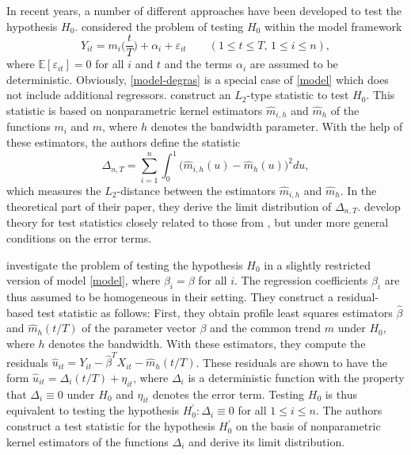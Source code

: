 \documentclass[a4paper,12pt]{article}
\begin{document}
In recent years, a number of different approaches have been developed to test the hypothesis $H_0$. \cite{DegrasWu2012} considered the problem of testing $H_0$ within the model framework
\begin{equation}\label{model-degras}
Y_{it} = m_i \Big( \frac{t}{T} \Big) + \alpha_i + \varepsilon_{it} \qquad (1 \le t \le T, \, 1 \le i \le n), 
\end{equation}
where $\mathbb{E}[\varepsilon_{it}] = 0$ for all $i$ and $t$ and the terms $\alpha_i$ are assumed to be deterministic. Obviously, \eqref{model-degras} is a special case of \eqref{model} which does not include additional regressors. \cite{DegrasWu2012} construct an $L_2$-type statistic to test $H_0$. This statistic is based on nonparametric kernel estimators $\hat{m}_{i,h}$ and $\hat{m}_h$ of the functions $m_i$ and $m$, where $h$ denotes the bandwidth parameter. With the help of these estimators, the authors define the statistic
\[ \Delta_{n,T} = \sum_{i=1}^n \int_0^1 \big(\hat{m}_{i,h}(u) - \hat{m}_h(u)\big)^2 du, \] 
which measures the $L_2$-distance between the estimators $\hat{m}_{i, h}$ and $\hat{m}_h$. In the theoretical part of their paper, they derive the limit distribution of $\Delta_{n,T}$. 
\cite{ChenWu2018} develop theory for test statistics closely related to those from \cite{DegrasWu2012}, but under more general conditions on the error terms. 


\cite{Zhang2012} investigate the problem of testing the hypothesis $H_0$ in a slightly restricted version of model \eqref{model}, where $\beta_i = \beta$ for all $i$. The regression coefficients $\beta_i$ are thus assumed to be homogeneous in their setting. They construct a residual-based test statistic as follows: First, they obtain profile least squares estimators $\hat{\beta}$ and $\hat{m}_h(t/T)$ of the parameter vector $\beta$ and the common trend $m$ under $H_0$, where $h$ denotes the bandwidth. With these estimators, they compute the residuals $\hat{u}_{it} = Y_{it} - \hat{\beta}^T X_{it} - \hat{m}_h(t/T)$. These residuals are shown to have the form $\hat{u}_{it} = \Delta_i(t/T) + \eta_{it}$, where $\Delta_i$ is a deterministic function with the property that $\Delta_i \equiv 0$ under $H_0$ and $\eta_{it}$ denotes the error term. Testing $H_0$ is thus equivalent to testing the hypothesis $H_0^\prime: \Delta_i \equiv 0$ for all $1 \le i \le n$. The authors construct a test statistic for the hypothesis $H_0^\prime$ on the basis of nonparametric kernel estimators of the functions $\Delta_i$ and derive its limit distribution.  
\end{document}
